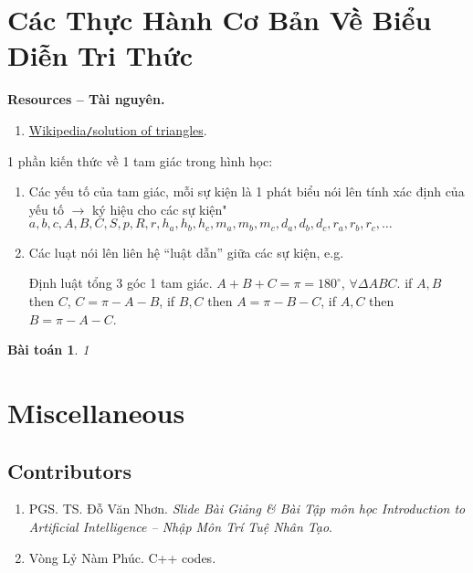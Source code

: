 \documentclass{article}
\newtheorem{baitoan}{Bài toán}
\begin{document}
\section{Các Thực Hành Cơ Bản Về Biểu Diễn Tri Thức}
\textbf{\textsf{Resources -- Tài nguyên.}}
\begin{enumerate}
    \item \href{https://en.wikipedia.org/wiki/Solution_of_triangles}{Wikipedia{\tt/}solution of triangles}.
\end{enumerate}
1 phần kiến thức về 1 tam giác trong hình học:
\begin{enumerate}
    \item Các yếu tố của tam giác, mỗi sự kiện là 1 phát biểu nói lên tính xác định của yếu tố $\to$ ký hiệu cho các sự kiện" $a,b,c,A,B,C,S,p,R,r,h_a,h_b,h_c,m_a,m_b,m_c,d_a,d_b,d_c,r_a,r_b,r_c,\ldots$
    \item Các luạt nói lên liên hệ ``luật dẫn'' giữa các sự kiện, e.g.
    
    {\sf Định luật tổng 3 góc 1 tam giác.} $A + B + C = \pi = 180^\circ$, $\forall\Delta ABC$. if $A,B$ then $C$, $C = \pi - A - B$, if $B,C$ then $A = \pi - B - C$, if $A,C$ then $B = \pi - A - C$.
\end{enumerate}

\begin{baitoan}
    1 
\end{baitoan}




\section{Miscellaneous}


\subsection{Contributors}

\begin{enumerate}
	\item PGS. TS. {\sc Đỗ Văn Nhơn}. {\it Slide Bài Giảng \& Bài Tập môn học Introduction to Artificial Intelligence -- Nhập Môn Trí Tuệ Nhân Tạo}.
    
	\item {\sc Vòng Lỷ Nàm Phúc.} C++ codes.
\end{enumerate}


\printbibliography[heading=bibintoc]
	
\end{document}
